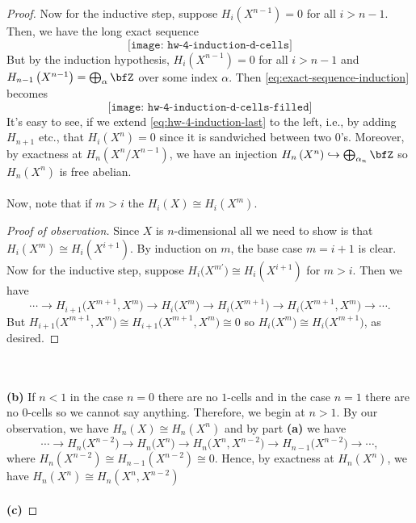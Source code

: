 \begin{proof}
Now for the inductive step, suppose $H_i(X^{n-1})=0$ for all $i>n-1$. Then,
we have the long exact sequence
\begin{equation}
\label{eq:exact-sequence-induction}
\texttt{[image: hw-4-induction-d-cells]}
\end{equation}
But by the induction hypothesis, $H_i\left(X^{n-1}\right)=0$ for
all $i>n-1$ and $H_{n-1}\left(X^{n-1}\right)=\bigoplus_\alpha\bfZ$ over
some index $\alpha$. Then \eqref{eq:exact-sequence-induction} becomes
\begin{equation}
\label{eq:hw-4-induction-last}
\texttt{[image: hw-4-induction-d-cells-filled]}
\end{equation}
It's easy to see, if we extend \eqref{eq:hw-4-induction-last} to the left,
i.e., by adding $H_{n+1}$ etc., that $H_i\left(X^n\right)=0$ since it is
sandwiched between two $0$'s. Moreover, by exactness at
$H_n\left(X^n/X^{n-1}\right)$, we have an injection
$H_n\left(X^n\right)\hookrightarrow\bigoplus_{\alpha_n}\bfZ$ so
$H_n\left(X^n\right)$ is free abelian.
\\\\
Now, note that if $m>i$ the $H_i(X)\cong H_i\left(X^m\right)$.
\begin{proof}[Proof of observation]
\renewcommand\qedsymbol{$\clubsuit$}
Since $X$ is $n$-dimensional all we need to show is that
$H_i\left(X^m\right)\cong H_i\left(X^{i+1}\right)$. By induction on $m$,
the base case $m=i+1$ is clear. Now for the inductive step, suppose
$H_i\bigl(X^{m'}\bigr)\cong H_i\left(X^{i+1}\right)$ for $m>i$. Then we
have
\begin{equation}
\label{eq:lemma-1}
\cdots\longrightarrow
H_{i+1}\bigl(X^{m+1},X^m\bigr)\longrightarrow
H_i\bigl(X^m\bigr)\longrightarrow
H_i\bigl(X^{m+1}\bigr)\longrightarrow
H_i\bigl(X^{m+1},X^m\bigr)\longrightarrow
\cdots.
\end{equation}
But $H_{i+1}\bigl(X^{m+1},X^m\bigr)\cong
H_{i+1}\bigl(X^{m+1},X^m\bigr)\cong 0$ so $H_i\bigl(X^m\bigr)\cong
H_i\bigl(X^{m+1}\bigr)$, as desired.
\end{proof}
\\\\
\textbf{(b)} If $n<1$ in the case $n=0$ there are no $1$-cells and in the
case $n=1$ there are no $0$-cells so we cannot say anything. Therefore, we
begin at $n>1$. By our observation, we have $H_n(X)\cong H_n(X^n)$ and by
part \textbf{(a)} we have
\begin{equation}
  \label{eq:short-exact-cells}
\cdots\longrightarrow
H_n\bigl(X^{n-2}\bigr)\longrightarrow
H_n\bigl(X^n\bigr)\longrightarrow
H_n\bigl(X^n,X^{n-2}\bigr)\longrightarrow
H_{n-1}\bigl(X^{n-2}\bigr)\longrightarrow
\cdots,
\end{equation}
where $H_n\left(X^{n-2}\right)\cong H_{n-1}\left(X^{n-2}\right)\cong
0$. Hence, by exactness at $H_n\left(X^n\right)$, we have
$H_n\left(X^n\right)\cong H_n\left(X^n,X^{n-2}\right)$
\\\\
\textbf{(c)}
\end{proof}
\newpage

